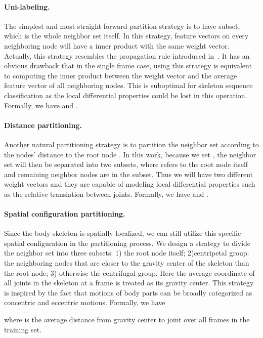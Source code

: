 \documentclass[letterpaper]{article} \usepackage{aaai18}  \usepackage{times}  \usepackage{helvet}  \usepackage{courier}  \usepackage{url}  \usepackage{graphicx}
\begin{document}
\paragraph{Uni-labeling.}
The simplest and most straight forward partition strategy is to have subset, which is the whole neighbor set itself.
In this strategy, feature vectors on every neighboring node will have a inner product with the same weight vector. 
Actually, this strategy resembles the propagation rule introduced in~\cite{Kipf2017ICLR}.
It has an obvious drawback that in the single frame case, using this strategy is equivalent to computing the inner product between the weight vector and the average feature vector of all neighboring nodes. 
This is suboptimal for skeleton sequence classification as the local differential properties could be lost in this operation.
Formally, we have  and .

\paragraph{Distance partitioning.}
Another natural partitioning strategy is to partition the neighbor set according to the nodes' distance  to the root node .
In this work, because we set , the neighbor set will then be separated into two subsets, where  refers to the root node itself and remaining neighbor nodes are in the  subset.
Thus we will have two different weight vectors and they are capable of modeling local differential properties such as the relative translation between joints. Formally, we have  and
 .

\paragraph{Spatial configuration partitioning.}
Since the body skeleton is spatially localized, we can still utilize this specific spatial configuration in the partitioning process.
We design a strategy to divide the neighbor set into three subsets:
1) the root node itself; 2)centripetal group: the neighboring nodes that are closer to the gravity center of the skeleton than the root node; 3) otherwise the centrifugal group.
Here the average coordinate of all joints in the skeleton at a frame is treated as its gravity center.
This strategy is inspired by the fact that motions of body parts can be broadly categorized as concentric and eccentric motions. Formally, we have 

where  is the average distance from gravity center to joint  over all frames in the training set.
 
\end{document}
